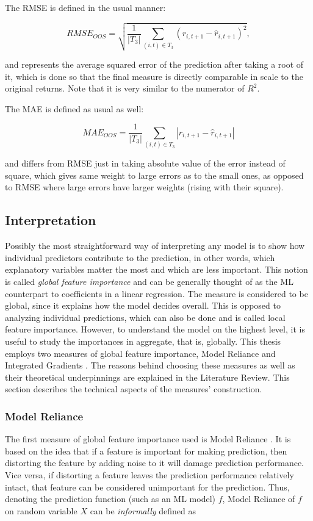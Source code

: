 	The RMSE is defined in the usual manner:   
	
	\begin{equation}
		RMSE_{OOS} = \sqrt{ \frac{1}{|T_3|} \sum_{(i,t)\in T_3} \left(r_{i,t+1}-	\hat{r}_{i, t+1}\right) ^2},	
	\end{equation}
	
	and represents the average squared error of the prediction after taking a root of it, which is done so that the final measure is directly comparable in scale to the original returns. Note that it is very similar to the numerator of $R^2$.
	
	The MAE is defined as usual as well: 
	
	\begin{equation}
		MAE_{OOS} = \frac{1}{|T_3|} \sum_{(i,t)\in T_3} |r_{i,t+1}-	\hat{r}_{i, t+1}|
	\end{equation}
	
	and differs from RMSE just in taking absolute value of the error instead of square, which gives same weight to large errors as to the small ones, as opposed to RMSE where large errors have larger weights (rising with their square). 
	
	
	\subsection{Interpretation}
	
	Possibly the most straightforward way of interpreting any model is to show how individual predictors contribute to the prediction, in other words, which explanatory variables matter the most and which are less important. This notion is called \textit{global feature importance} and can be generally thought of as the ML counterpart to coefficients in a linear regression. The measure is considered to be global, since it explains how the model decides overall. This is opposed to analyzing individual predictions, which can also be done and is called local feature importance. However, to understand the model on the highest level, it is useful to study the importances in aggregate, that is, globally. This thesis employs two measures of global feature importance, Model Reliance \citep{fisher2019all} and Integrated Gradients \citep{sundararajan2017axiomatic}. The reasons behind choosing these measures as well as their theoretical underpinnings are explained in the Literature Review. This section describes the technical aspects of the measures' construction.
	
	\subsubsection{Model Reliance}
		The first measure of global feature importance used is Model Reliance \citep{fisher2019all}. It is based on the idea that if a feature is important for making prediction, then distorting the feature by adding noise to it will damage prediction performance. Vice versa, if distorting a feature leaves the prediction performance relatively intact, that feature can be considered unimportant for the prediction. Thus, denoting  the prediction function (such as an ML model) $f$, Model Reliance of  $f$ on random variable $X$ can be \textit{informally} defined as
		
